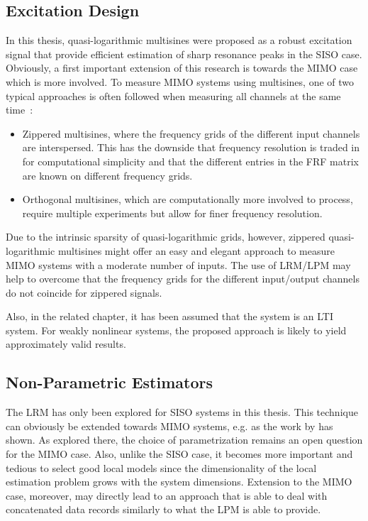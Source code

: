  \subsection{Excitation Design}
  In this thesis, quasi-logarithmic multisines were proposed as a robust excitation signal that provide efficient estimation of sharp resonance peaks in the \gls{SISO} case.
  Obviously, a first important extension of this research is towards the \gls{MIMO} case which is more involved.
  To measure \gls{MIMO} systems using multisines, one of two typical approaches is often followed when measuring all channels at the same time~\citep[Section 2.7]{Pintelon2012}:
  \begin{itemize}
    \item Zippered multisines, where the frequency grids of the different input channels are interspersed. This has the downside that frequency resolution is traded in for computational simplicity and that the different entries in the \gls{FRF} matrix are known on different frequency grids.
    \item Orthogonal multisines, which are computationally more involved to process, require multiple experiments but allow for finer frequency resolution.
  \end{itemize}
  Due to the intrinsic sparsity of quasi-logarithmic grids, however, zippered quasi-logarithmic multisines might offer an easy and elegant  approach to measure \gls{MIMO} systems with a moderate number of inputs.
  The use of \gls{LRM}/\gls{LPM} may help to overcome that the frequency grids for the different input/output channels do not coincide for zippered signals.

  Also, in the related chapter, it has been assumed that the system is an \gls{LTI} system.
  For weakly nonlinear systems, the proposed approach is likely to yield approximately valid results.

  \subsection{Non-Parametric Estimators}
    The \gls{LRM} has only been explored for \gls{SISO} systems in this thesis.
    This technique can obviously be extended towards \gls{MIMO} systems, e.g. as the work by \citet{vanRietschoten2015MSc} has shown.
    As explored there, the choice of parametrization remains an open question for the \gls{MIMO} case.
    Also, unlike the \gls{SISO} case, it becomes more important and tedious to select good local models since the dimensionality of the local estimation problem grows with the system dimensions.
    Extension to the \gls{MIMO} case, moreover, may directly lead to an approach that is able to deal with concatenated data records similarly to what the \gls{LPM} is able to provide.

